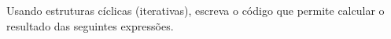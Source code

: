 \documentclass[addpoints]{exam}
\renewcommand*\half{.5}
\begin{document}
{\begin{questions}
%
		
		
		
	
	\question Usando estruturas cíclicas (iterativas), escreva o código que permite calcular o resultado das seguintes expressões.
	
\end{questions}}
\end{document}
